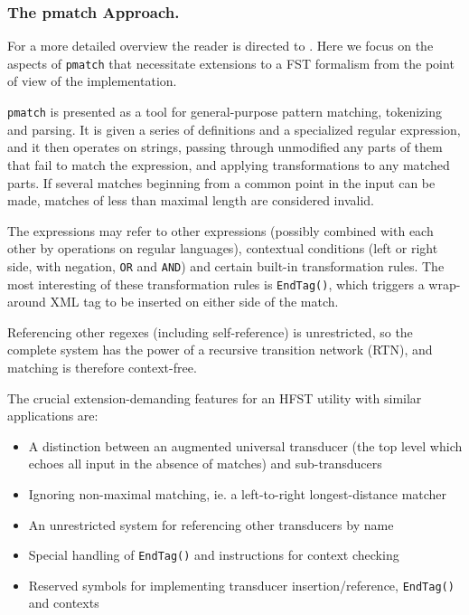 \documentclass{llncs}
\begin{document}
\subsubsection{The pmatch Approach.}

For a more detailed overview the reader is directed to \cite{karttunen/2011}.
Here we focus on the aspects of \verb!pmatch! that necessitate extensions
to a FST formalism from the point of view of the implementation.

\verb!pmatch! is presented as a tool for general-purpose pattern matching,
tokenizing and parsing. It is given a series of definitions and a
specialized regular expression, and it then operates on strings, passing
through unmodified any parts of them that fail to match the expression,
and applying transformations to any matched parts. If several matches beginning
from a common point in the input can be made, matches of less than maximal
length are considered invalid.

The expressions may refer to other expressions (possibly combined with each
other by operations on regular languages), contextual conditions
(left or right side, with negation, \verb!OR! and \verb!AND!) and certain
built-in transformation rules. The most interesting of these transformation
rules is \verb!EndTag()!, which triggers a wrap-around XML tag to be inserted
on either side of the match.

Referencing other regexes (including self-reference) is unrestricted, so
the complete system has the power of a recursive transition network (RTN),
and matching is therefore context-free.

The crucial extension-demanding features for an HFST utility
with similar applications are:

\begin{itemize}
\item A distinction between an augmented universal transducer (the top level
  which echoes all input in the absence of matches) and sub-transducers
\item Ignoring non-maximal matching, ie. a left-to-right longest-distance
  matcher
\item An unrestricted system for referencing other transducers by name
\item Special handling of \verb!EndTag()! and instructions for context
  checking
\item Reserved symbols for implementing transducer insertion/reference,
  \verb!EndTag()! and contexts
\end{itemize}
\end{document}
